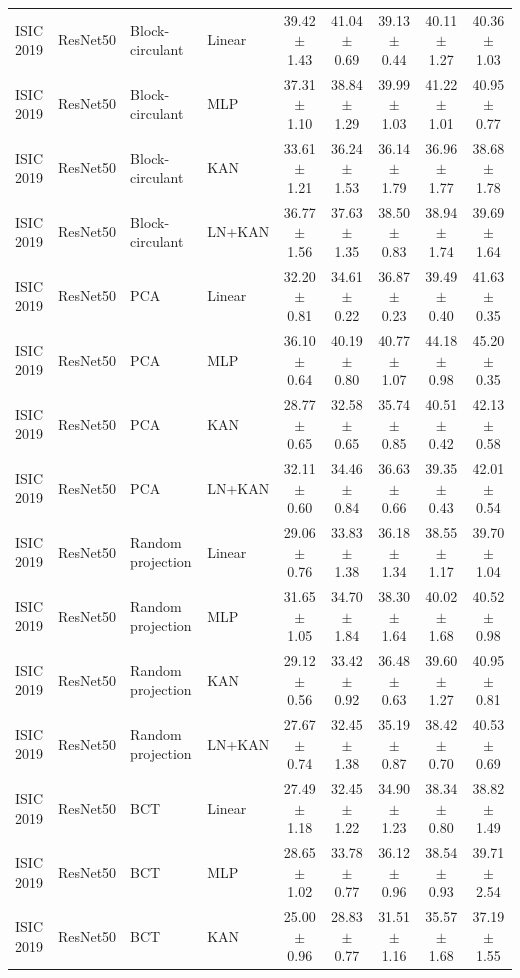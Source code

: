 \documentclass[10pt]{article}
\begin{document}
\begin{longtable}{llllccccc}
ISIC 2019 & ResNet50 & Block-circulant & Linear & 39.42 $\pm$ 1.43 & 41.04 $\pm$ 0.69 & 39.13 $\pm$ 0.44 & 40.11 $\pm$ 1.27 & 40.36 $\pm$ 1.03 \\
ISIC 2019 & ResNet50 & Block-circulant & MLP & 37.31 $\pm$ 1.10 & 38.84 $\pm$ 1.29 & 39.99 $\pm$ 1.03 & 41.22 $\pm$ 1.01 & 40.95 $\pm$ 0.77 \\
ISIC 2019 & ResNet50 & Block-circulant & KAN & 33.61 $\pm$ 1.21 & 36.24 $\pm$ 1.53 & 36.14 $\pm$ 1.79 & 36.96 $\pm$ 1.77 & 38.68 $\pm$ 1.78 \\
ISIC 2019 & ResNet50 & Block-circulant & LN+KAN & 36.77 $\pm$ 1.56 & 37.63 $\pm$ 1.35 & 38.50 $\pm$ 0.83 & 38.94 $\pm$ 1.74 & 39.69 $\pm$ 1.64 \\
ISIC 2019 & ResNet50 & PCA & Linear & 32.20 $\pm$ 0.81 & 34.61 $\pm$ 0.22 & 36.87 $\pm$ 0.23 & 39.49 $\pm$ 0.40 & 41.63 $\pm$ 0.35 \\
ISIC 2019 & ResNet50 & PCA & MLP & 36.10 $\pm$ 0.64 & 40.19 $\pm$ 0.80 & 40.77 $\pm$ 1.07 & 44.18 $\pm$ 0.98 & 45.20 $\pm$ 0.35 \\
ISIC 2019 & ResNet50 & PCA & KAN & 28.77 $\pm$ 0.65 & 32.58 $\pm$ 0.65 & 35.74 $\pm$ 0.85 & 40.51 $\pm$ 0.42 & 42.13 $\pm$ 0.58 \\
ISIC 2019 & ResNet50 & PCA & LN+KAN & 32.11 $\pm$ 0.60 & 34.46 $\pm$ 0.84 & 36.63 $\pm$ 0.66 & 39.35 $\pm$ 0.43 & 42.01 $\pm$ 0.54 \\
ISIC 2019 & ResNet50 & Random projection & Linear & 29.06 $\pm$ 0.76 & 33.83 $\pm$ 1.38 & 36.18 $\pm$ 1.34 & 38.55 $\pm$ 1.17 & 39.70 $\pm$ 1.04 \\
ISIC 2019 & ResNet50 & Random projection & MLP & 31.65 $\pm$ 1.05 & 34.70 $\pm$ 1.84 & 38.30 $\pm$ 1.64 & 40.02 $\pm$ 1.68 & 40.52 $\pm$ 0.98 \\
ISIC 2019 & ResNet50 & Random projection & KAN & 29.12 $\pm$ 0.56 & 33.42 $\pm$ 0.92 & 36.48 $\pm$ 0.63 & 39.60 $\pm$ 1.27 & 40.95 $\pm$ 0.81 \\
ISIC 2019 & ResNet50 & Random projection & LN+KAN & 27.67 $\pm$ 0.74 & 32.45 $\pm$ 1.38 & 35.19 $\pm$ 0.87 & 38.42 $\pm$ 0.70 & 40.53 $\pm$ 0.69 \\
ISIC 2019 & ResNet50 & BCT & Linear & 27.49 $\pm$ 1.18 & 32.45 $\pm$ 1.22 & 34.90 $\pm$ 1.23 & 38.34 $\pm$ 0.80 & 38.82 $\pm$ 1.49 \\
ISIC 2019 & ResNet50 & BCT & MLP & 28.65 $\pm$ 1.02 & 33.78 $\pm$ 0.77 & 36.12 $\pm$ 0.96 & 38.54 $\pm$ 0.93 & 39.71 $\pm$ 2.54 \\
ISIC 2019 & ResNet50 & BCT & KAN & 25.00 $\pm$ 0.96 & 28.83 $\pm$ 0.77 & 31.51 $\pm$ 1.16 & 35.57 $\pm$ 1.68 & 37.19 $\pm$ 1.55 \\

\end{longtable}
\end{document}
